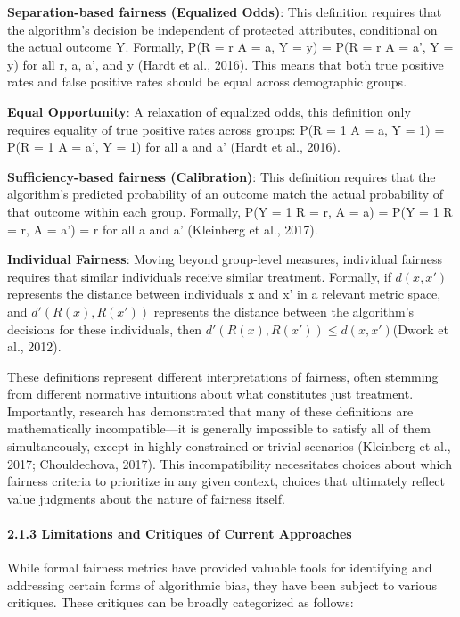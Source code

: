 \textbf{Separation-based fairness (Equalized Odds)}: This definition
requires that the algorithm's decision be independent of protected
attributes, conditional on the actual outcome Y. Formally, P(R = r
\textbar{} A = a, Y = y) = P(R = r \textbar{} A = a', Y = y) for all r,
a, a', and y (Hardt et al., 2016). This means that both true positive
rates and false positive rates should be equal across demographic
groups.

\textbf{Equal Opportunity}: A relaxation of equalized odds, this
definition only requires equality of true positive rates across groups:
P(R = 1 \textbar{} A = a, Y = 1) = P(R = 1 \textbar{} A = a', Y = 1) for
all a and a' (Hardt et al., 2016).

\textbf{Sufficiency-based fairness (Calibration)}: This definition
requires that the algorithm's predicted probability of an outcome match
the actual probability of that outcome within each group. Formally, P(Y
= 1 \textbar{} R = r, A = a) = P(Y = 1 \textbar{} R = r, A = a') = r for
all a and a' (Kleinberg et al., 2017).

\textbf{Individual Fairness}: Moving beyond group-level measures,
individual fairness requires that similar individuals receive similar
treatment. Formally, if \(d(x, x')\) represents the distance between
individuals x and x' in a relevant metric space, and \(d'(R(x), R(x'))\)
represents the distance between the algorithm's decisions for these
individuals, then \(d'(R(x), R(x')) \leq d(x, x')\)(Dwork et al., 2012).

These definitions represent different interpretations of fairness, often
stemming from different normative intuitions about what constitutes just
treatment. Importantly, research has demonstrated that many of these
definitions are mathematically incompatible---it is generally impossible
to satisfy all of them simultaneously, except in highly constrained or
trivial scenarios (Kleinberg et al., 2017; Chouldechova, 2017). This
incompatibility necessitates choices about which fairness criteria to
prioritize in any given context, choices that ultimately reflect value
judgments about the nature of fairness itself.

\paragraph{2.1.3 Limitations and Critiques of Current
Approaches}\label{limitations-and-critiques-of-current-approaches}

While formal fairness metrics have provided valuable tools for
identifying and addressing certain forms of algorithmic bias, they have
been subject to various critiques. These critiques can be broadly
categorized as follows:

